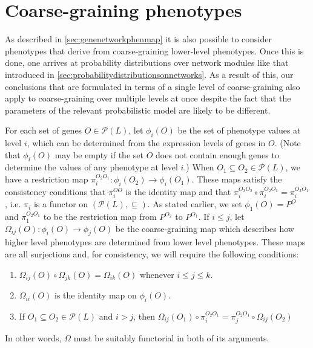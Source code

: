 \section{Coarse-graining phenotypes}

As described in \ref{sec:genenetworkphenmap} it is also possible to consider phenotypes that derive from coarse-graining lower-level phenotypes. Once this is done, one arrives at probability distributions over network modules like that introduced in \ref{sec:probabilitydistributionsonnetworks}. As a result of this, our conclusions that are formulated in terms of a single level of coarse-graining \gnpm{} also apply to coarse-graining over multiple levels at once despite the fact that the parameters of the relevant probabilistic model are likely to be different.

For each set of genes $O \in \mathcal{P}(L)$, let $\phi_i (O)$ be the set of phenotype values at level $i$, which can be determined from the expression levels of genes in $O$.  (Note that $\phi_i (O)$ may be empty if the set $O$ does not contain enough genes to determine the values of any phenotype at level $i$.)  When $O_1 \subseteq O_2 \in \mathcal{P}(L)$, we have a restriction map $\pi_i^{O_2 O_1} \colon \phi_i(O_2) \to \phi_i(O_1)$.  These maps satisfy the consistency conditions that $\pi_i^{OO}$ is the identity map and that $\pi_i^{O_3 O_2} \circ \pi_i^{O_2 O_1} = \pi_i^{O_3 O_1}$, i.e. $\pi_i$ is a functor on $(\mathcal{P}(L), \subseteq)$.  As stated earlier, we set $\phi_1 (O) = P^O$ and $\pi_1^{O_2 O_1}$ to be the restriction map from $P^{O_2}$ to $P^{O_1}$.  If $i \le j$, let $\Omega_{ij}(O) : \phi_i(O) \to \phi_j(O)$ be the coarse-graining map which describes how higher level phenotypes are determined from lower level phenotypes.  These maps are all surjections and, for consistency, we will require the following conditions:
\begin{enumerate}
\item $\Omega_{ij}(O) \circ \Omega_{jk}(O) = \Omega_{ik}(O)$ whenever $i \le j \le k$.
\item $\Omega_{ii}(O)$ is the identity map on $\phi_i (O)$.
\item If $O_1 \subseteq O_2 \in \mathcal{P}(L)$ and $i > j$, then $\Omega_{ij}(O_1) \circ \pi_i^{O_2 O_1} = \pi_j^{O_2 O_1} \circ \Omega_{ij}(O_2)$
\end{enumerate}
In other words, $\Omega$ must be suitably functorial in both of its arguments.

